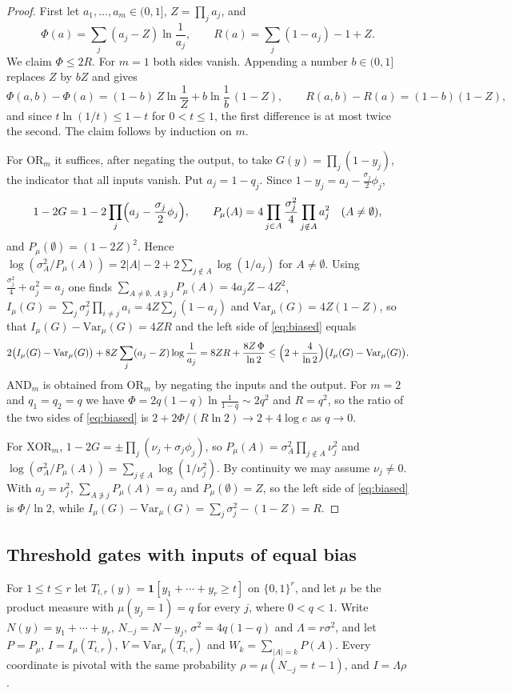 \documentclass[11pt]{amsart}
\theoremstyle{definition}
\theoremstyle{remark}
\newcommand{\Var}{\mathrm{Var}}
\newcommand{\bits}{\{0,1\}}
\begin{document}
\begin{proof}
First let $a_1,\dots,a_m\in(0,1]$, $Z=\prod_ja_j$, and
\[
\Phi(a)=\sum_j(a_j-Z)\ln\frac1{a_j},\qquad R(a)=\sum_j(1-a_j)-1+Z .
\]
We claim $\Phi\le2R$. For $m=1$ both sides vanish. Appending a number $b\in(0,1]$ replaces $Z$ by $bZ$ and gives
\[
\Phi(a,b)-\Phi(a)=(1-b)\,Z\ln\frac1Z+b\ln\frac1b\,(1-Z),\qquad R(a,b)-R(a)=(1-b)(1-Z),
\]
and since $t\ln(1/t)\le1-t$ for $0<t\le1$, the first difference is at most twice the second. The claim follows by
induction on $m$.

For $\mathrm{OR}_m$ it suffices, after negating the output, to take $G(y)=\prod_j(1-y_j)$, the indicator that all
inputs vanish. Put $a_j=1-q_j$. Since $1-y_j=a_j-\frac{\sigma_j}2\phi_j$,
\[
1-2G=1-2\prod_j\Bigl(a_j-\frac{\sigma_j}2\phi_j\Bigr),\qquad
P_\mu(A)=4\prod_{j\in A}\frac{\sigma_j^2}4\prod_{j\notin A}a_j^2\quad(A\ne\emptyset),
\]
and $P_\mu(\emptyset)=(1-2Z)^2$. Hence $\log(\sigma_A^2/P_\mu(A))=2|A|-2+2\sum_{j\notin A}\log(1/a_j)$ for
$A\ne\emptyset$. Using $\frac{\sigma_j^2}4+a_j^2=a_j$ one finds $\sum_{A\ne\emptyset,\,A\not\ni j}P_\mu(A)=4a_jZ-4Z^2$,
$I_\mu(G)=\sum_j\sigma_j^2\prod_{i\ne j}a_i=4Z\sum_j(1-a_j)$ and $\Var_\mu(G)=4Z(1-Z)$, so that
$I_\mu(G)-\Var_\mu(G)=4ZR$ and the left side of \eqref{eq:biased} equals
\[
2\bigl(I_\mu(G)-\Var_\mu(G)\bigr)+8Z\sum_j(a_j-Z)\log\frac1{a_j}
=8ZR+\frac{8Z\,\Phi}{\ln2}\le\Bigl(2+\frac4{\ln2}\Bigr)\bigl(I_\mu(G)-\Var_\mu(G)\bigr).
\]
$\mathrm{AND}_m$ is obtained from $\mathrm{OR}_m$ by negating the inputs and the output. For $m=2$ and $q_1=q_2=q$
we have $\Phi=2q(1-q)\ln\frac1{1-q}\sim2q^2$ and $R=q^2$, so the ratio of the two sides of \eqref{eq:biased} is
$2+2\Phi/(R\ln2)\to2+4\log e$ as $q\to0$.

For $\mathrm{XOR}_m$, $1-2G=\pm\prod_j(\nu_j+\sigma_j\phi_j)$, so $P_\mu(A)=\sigma_A^2\prod_{j\notin A}\nu_j^2$ and
$\log(\sigma_A^2/P_\mu(A))=\sum_{j\notin A}\log(1/\nu_j^2)$. By continuity we may assume $\nu_j\ne0$. With $a_j=\nu_j^2$,
$\sum_{A\not\ni j}P_\mu(A)=a_j$ and $P_\mu(\emptyset)=Z$, so the left side of \eqref{eq:biased} is $\Phi/\ln2$, while
$I_\mu(G)-\Var_\mu(G)=\sum_j\sigma_j^2-(1-Z)=R$.
\end{proof}

\subsection*{Threshold gates with inputs of equal bias}
For $1\le t\le r$ let $T_{t,r}(y)=\mathbf 1[y_1+\cdots+y_r\ge t]$ on $\bits^r$, and let $\mu$ be the product measure
with $\mu(y_j=1)=q$ for every $j$, where $0<q<1$. Write $N(y)=y_1+\cdots+y_r$, $N_{-j}=N-y_j$, $\sigma^2=4q(1-q)$
and $\Lambda=r\sigma^2$, and let $P=P_\mu$, $I=I_\mu(T_{t,r})$, $V=\Var_\mu(T_{t,r})$ and
$W_k=\sum_{|A|=k}P(A)$. Every coordinate is pivotal with the same probability $\rho=\mu(N_{-j}=t-1)$, and
$I=\Lambda\rho$.
\end{document}

